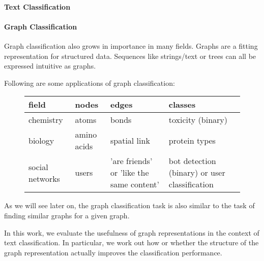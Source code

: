 

\paragraph{Text Classification}

\paragraph{Graph Classification}
Graph classification also grows in importance in many fields.
Graphs are a fitting representation for structured data.
Sequences like strings/text or trees can all be expressed intuitive as graphs.

Following are some applications of graph classification:

\begin{figure}[ht]
\centering
\begin{tabular}{llll}
field & nodes & edges & classes \\
\midrule
chemistry & atoms & bonds & toxicity (binary) \\
biology & amino acids & spatial link & protein types \\ 
social networks & users & 'are friends' or 'like the same content' & bot detection (binary) or user classification
\end{tabular}
\end{figure}

As we will see later on, the graph classification task is also similar to the task of finding similar graphs for a given graph.

In this work, we evaluate the usefulness of graph representations in the context of text classification. In particular, we work out how or whether the structure of the graph representation actually improves the classification performance.

